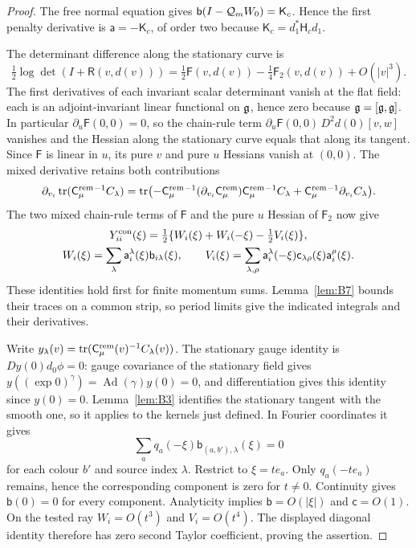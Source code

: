 \begin{proof}
The free normal equation gives $\mathsf{b}(I-\mathcal Q_mW_0)=\mathsf K_c$. Hence the first penalty derivative is $\mathsf a=-\mathsf K_c$, of order two because $\mathsf K_c=d_1^*\mathsf H_cd_1$.

The determinant difference along the stationary curve is
\begin{equation*}
\tfrac12\log\det(I+\mathsf R(v,d(v)))
=\tfrac12\mathsf F(v,d(v))-\tfrac14\mathsf F_2(v,d(v))+O(|v|^3).
\end{equation*}
The first derivatives of each invariant scalar determinant vanish at the flat field: each is an adjoint-invariant linear functional on $\mathfrak{g}$, hence zero because $\mathfrak{g}=[\mathfrak{g},\mathfrak{g}]$. In particular $\partial_u\mathsf F(0,0)=0$, so the chain-rule term $\partial_u\mathsf F(0,0)\,D^2d(0)[v,w]$ vanishes and the Hessian along the stationary curve equals that along its tangent. Since $\mathsf F$ is linear in $u$, its pure $v$ and pure $u$ Hessians vanish at $(0,0)$. The mixed derivative retains both contributions
\begin{equation*}
\partial_{v_i}\operatorname{tr}(\mathsf C^{\rm rem}_\mu{}^{-1}C_\lambda)
=\operatorname{tr}\bigl(-\mathsf C^{\rm rem}_\mu{}^{-1}(\partial_{v_i}\mathsf C^{\rm rem}_\mu)\mathsf C^{\rm rem}_\mu{}^{-1}C_\lambda
       +\mathsf C^{\rm rem}_\mu{}^{-1}\partial_{v_i}C_\lambda\bigr).
\end{equation*}
The two mixed chain-rule terms of $\mathsf F$ and the pure $u$ Hessian of $\mathsf F_2$ now give
\begin{gather*}
Y^{\rm con}_{ii}(\xi)=\tfrac12\{W_i(\xi)+W_i(-\xi)-\tfrac12 V_i(\xi)\},\\
W_i(\xi)=\sum_\lambda\mathsf a_i^\lambda(\xi)\mathsf b_{i\lambda}(\xi),\qquad
V_i(\xi)=\sum_{\lambda,\rho}\mathsf a_i^\lambda(-\xi)
\mathsf c_{\lambda\rho}(\xi)\mathsf a_i^\rho(\xi).
\end{gather*}
These identities hold first for finite momentum sums. Lemma~\ref{lem:B7} bounds their traces on a common strip, so period limits give the indicated integrals and their derivatives.

Write $y_\lambda(v)=\operatorname{tr}(\mathsf C^{\rm rem}_\mu(v)^{-1}C_\lambda(v))$. The stationary gauge identity is $Dy(0)d_0\phi=0$: gauge covariance of the stationary field gives $y((\exp0)^\gamma)=\operatorname{Ad}(\gamma)y(0)=0$, and differentiation gives this identity since $y(0)=0$. Lemma~\ref{lem:B3} identifies the stationary tangent with the smooth one, so it applies to the kernels just defined. In Fourier coordinates it gives
\begin{equation*}
\sum_a q_a(-\xi)\mathsf b_{(a,b'),\lambda}(\xi)=0
\end{equation*}
for each colour $b'$ and source index $\lambda$. Restrict to $\xi=te_a$. Only $q_a(-te_a)$ remains, hence the corresponding component is zero for $t\ne0$. Continuity gives $\mathsf b(0)=0$ for every component. Analyticity implies $\mathsf b=O(|\xi|)$ and $\mathsf c=O(1)$. On the tested ray $W_i=O(t^3)$ and $V_i=O(t^4)$. The displayed diagonal identity therefore has zero second Taylor coefficient, proving the assertion.
\end{proof}
